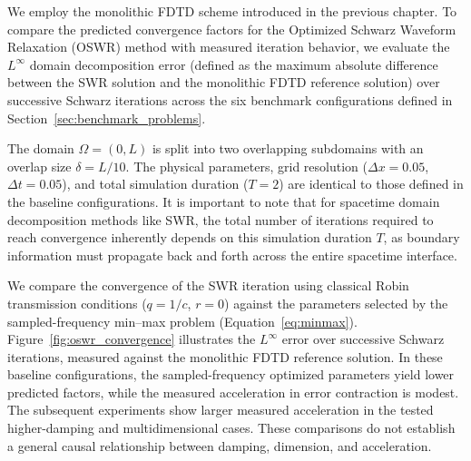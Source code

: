 \documentclass{Configuration_Files/PoliMi3i_thesis}
\newif\ifshowthesischanges
\DeclareRobustCommand{\thesischange}[2]{%
    \ifshowthesischanges
        \textcolor{#1}{#2}%
    \else
        #2%
    \fi
}
\def\thesischange#1#2{#2}%
\begin{document}
We employ the monolithic FDTD scheme introduced in the previous chapter. To compare the predicted convergence factors for the Optimized Schwarz Waveform Relaxation (OSWR) method with measured iteration behavior, we evaluate the $L^\infty$ domain decomposition error (defined as the maximum absolute difference between the SWR solution and the monolithic FDTD reference solution) over successive Schwarz iterations across the six benchmark configurations defined in Section~\ref{sec:benchmark_problems}.

The domain $\Omega=(0,L)$ is split into two overlapping subdomains with an overlap size $\delta=L/10$. The physical parameters, grid resolution ($\Delta x=0.05$, $\Delta t=0.05$), and total simulation duration ($T=2$) are identical to those defined in the baseline configurations. It is important to note that for spacetime domain decomposition methods like SWR, the total number of iterations required to reach convergence inherently depends on this simulation duration $T$, as boundary information must propagate back and forth across the entire spacetime interface.

We compare the convergence of the SWR iteration using classical Robin transmission conditions ($q=1/c$, $r=0$) against the parameters selected by the sampled-frequency min--max problem (Equation~\ref{eq:minmax}). Figure~\ref{fig:oswr_convergence} illustrates the $L^\infty$ error over successive Schwarz iterations, measured against the monolithic FDTD reference solution. \thesischange{blue}{In these baseline configurations, the sampled-frequency optimized parameters yield lower predicted factors, while the measured acceleration in error contraction is modest. The subsequent experiments show larger measured acceleration in the tested higher-damping and multidimensional cases. These comparisons do not establish a general causal relationship between damping, dimension, and acceleration.}
\end{document}
